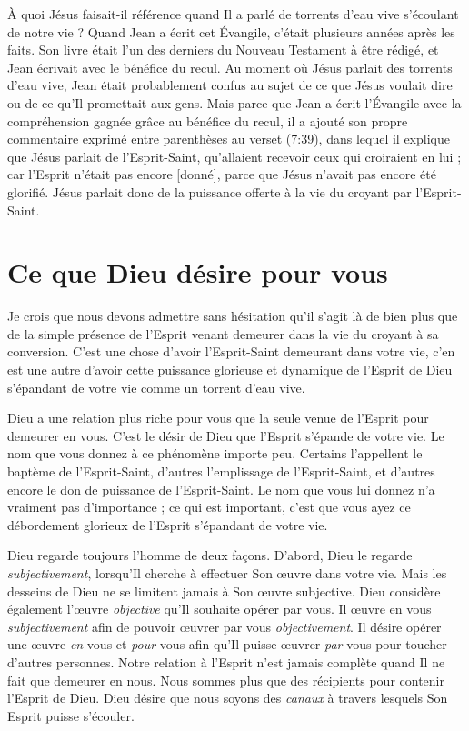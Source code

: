 À quoi Jésus faisait-il référence quand Il a parlé de
 \og torrents d'eau vive \fg{} s'écoulant de notre vie ?
 Quand Jean a écrit cet Évangile, c'était plusieurs années après les faits.
 Son livre était l'un des derniers du Nouveau Testament à être rédigé,
 et Jean écrivait avec le bénéfice du recul. Au moment où Jésus parlait
 des torrents d'eau vive, Jean était probablement confus au sujet de ce que
 Jésus voulait dire ou de ce qu'Il promettait aux gens.
 Mais parce que Jean a écrit l'Évangile avec la compréhension gagnée grâce
 au bénéfice du recul, il a ajouté son propre commentaire exprimé entre
 parenthèses au verset (7:39), dans lequel il explique que Jésus
 parlait de l'Esprit-Saint, \og qu'allaient recevoir ceux qui croiraient
 en lui ; car l'Esprit n'était pas encore [donné], parce que Jésus n'avait
 pas encore été glorifié. \fg{}
 Jésus parlait donc de la puissance offerte à la vie du croyant
 par l'Esprit-Saint.


\section*{Ce que Dieu désire pour vous}

Je crois que nous devons admettre sans hésitation qu'il s'agit là de bien
 plus que de la simple présence de l'Esprit venant demeurer dans la vie
 du croyant à sa conversion. C'est une chose d'avoir l'Esprit-Saint
 demeurant dans votre vie, c'en est une autre d'avoir cette puissance
 glorieuse et dynamique de l'Esprit de Dieu s'épandant de votre vie
 comme un torrent d'eau vive.

Dieu a une relation plus riche pour vous que la seule venue de l'Esprit
 pour demeurer en vous. C'est le désir de Dieu que l'Esprit s'épande
 de votre vie. Le nom que vous donnez à ce phénomène importe peu.
 Certains l'appellent le baptème de l'Esprit-Saint,
 d'autres l'emplissage de l'Esprit-Saint, et d'autres encore le don
 de puissance de l'Esprit-Saint. Le nom que vous lui donnez n'a vraiment
 pas d'im\-por\-tan\-ce ; ce qui est important, c'est que vous ayez ce débordement
 glorieux de l'Esprit s'épandant de votre vie.

Dieu regarde toujours l'homme de deux façons. D'abord, Dieu le regarde
 \emph{subjectivement}, lorsqu'Il cherche à effectuer Son œuvre
 dans votre vie.
 Mais les desseins de Dieu ne se limitent jamais à Son œuvre subjective.
 Dieu considère également l'œuvre \emph{objective} qu'Il souhaite opérer
 par vous.
 Il œuvre en vous \emph{subjectivement} afin de pouvoir œuvrer par vous
 \emph{objectivement}. Il désire opérer une œuvre \emph{en} vous
 et \emph{pour} vous afin
 qu'Il puisse œuvrer \emph{par} vous pour toucher d'autres personnes.
 Notre relation à l'Esprit n'est jamais complète quand Il ne fait que
 demeurer en nous. Nous sommes plus que des récipients pour contenir
 l'Esprit de Dieu. Dieu désire que nous soyons des \emph{canaux} à travers
 lesquels Son Esprit puisse s'écouler.


